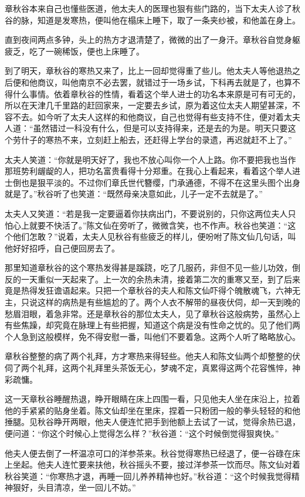 \documentclass[12pt,UTF8]{ctexbook}
\begin{document}
{{{章秋谷本来自己也懂些医道，他太夫人的医理也狠有些门路的，当下太夫人诊了秋谷的脉，知道是发寒热，便叫他在榻床上睡下，取了一条夹纱被，和他盖在身上。

直到夜间两点多钟，头上的热方才退清楚了，微微的出了一身汗。章秋谷自觉身躯疲乏，吃了一碗稀饭，便也上床睡了。

到了明天，章秋谷的寒热又来了，比上一回却觉得重了些儿。他太夫人等他退热之后便和他商议，叫他南京不必去罢，就错过于一场乡试，下科再去就是了，也算不得什么事情。依着章秋谷的性情，看着这个举人进士的功名本来原是可有可无的，所以在天津几千里路的赶回家来，一定要去乡试，原为着这位太夫人期望甚深，不容不去。如今听了太夫人这样的和他商议，自己也觉得有些支持不住，便对着太夫人道：“虽然错过一科没有什么，但是可以支持得来，还是去的为是。明天只要这个劳什子的寒热不来，立刻赶上船去，还赶得上学台的录遗，再迟就赶不上了。”

太夫人笑道：“你就是明天好了，我也不放心叫你一个人上路。你不要把我也当作那班势利龌龊的人，把功名富贵看得十分郑重。在我心上看起来，看着这个举人进士倒也是狠平淡的。不过你们章氏世代簪缨，门承通德，不得不在这里头图个出身就是了。”秋谷听了也笑道：“既然母亲决意如此，儿子一定不去就是了。”

太夫人又笑道：“若是我一定要逼着你扶病出门，不要说别的，只你这两位夫人只怕心上就要不快活了。”陈文仙在旁听了，微微含笑，也不作声。秋谷也笑道：“这个他们怎敢？”说着，太夫人见秋谷有些疲乏的样儿，便吩咐了陈文仙几句话，叫他好好招呼，自己便回房去了。

那里知道章秋谷的这个寒热发得甚是蹊跷，吃了几服药，非但不见一些儿功效，倒反的一天重似一天起来了。上一次的余热未清，接着第二次的重寒又至，到了后来竟是热得发狂谵语起来。只把一个章秋谷的夫人和陈文仙吓得个魄散魂飞，六神无主，只说这样的病热是有些尴尬的了。两个人衣不解带的昼夜伏伺，却一天到晚的愁眉泪眼，着急非常。还是章秋谷的那位太夫人，见了章秋谷这般病势，虽然心上有些焦躁，却究竟在脉理上有些把握，知道这个病是没有性命之忧的。见了他们两个人急到这般模样，免不得安慰一番，叫他们不要着急。这两个人听了略略放心。

章秋谷整整的病了两个礼拜，方才寒热来得轻些。他夫人和陈文仙两个却整整的伏伺了两个礼拜，这两个礼拜里头茶饭无心，梦魂不定，真累得这两个花容憔悴，神彩疏慵。

这一天章秋谷睡醒热退，睁开眼睛在床上四围一看，只见他夫人坐在床沿上，拉着他的手紧紧的贴身坐着。陈文仙却坐在里床，捏着一只粉团一般的拳头轻轻的和他捶腿。见秋谷睁开两眼，他夫人便连忙把手到他额上去试了一试，觉得余热已退，便问道：“你这个时候心上觉得怎么样？”秋谷道：“这个时候倒觉得狠爽快。”

他夫人便去倒了一杯温凉可口的洋参茶来。秋谷觉得寒热已经退了，便一谷碌在床上坐起。他夫人连忙要来扶他，秋谷摇头不要，接过洋参茶一饮而尽。陈文仙对着秋谷笑道：“你寒热才退，再睡一回儿养养精神也好。”秋谷道：“这个时候我觉得精神狠好，头目清凉，坐一回儿不妨。”

}}}
\end{document}
